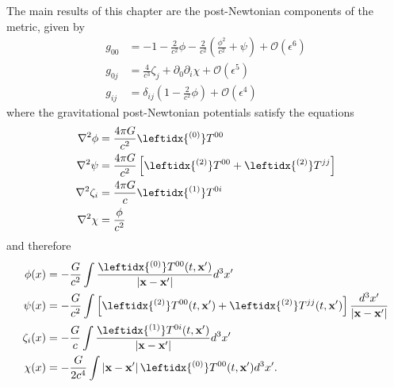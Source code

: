 The main results of this chapter are the post-Newtonian components of the metric, given by
\begin{subequations}\label{eq:PNMetricTensor}
\begin{align}
g_{00} &= -1 - \frac{2}{c^2} \phi - \frac{2}{c^2} \left(\frac{\phi^2}{c^2} + \psi \right) + \mathcal{O} \left( \epsilon^6 \right) \\
g_{0j} &= \frac{4}{c^3} \zeta_j + \partial_0 \partial_i \chi +  \mathcal{O} \left( \epsilon^5 \right) \\
g_{ij} &= \delta_{ij} \left( 1 - \frac{2}{c^2} \phi \right) + \mathcal{O} \left( \epsilon^4 \right)
\end{align}
\end{subequations}
where the gravitational post-Newtonian potentials satisfy the equations
\begin{subequations}\label{eq:PoissonEquations}
\begin{align}
\nabla^2 \phi &= \frac{4\pi G}{c^2} \leftidx{^{(0)}} T^{00} \\
\nabla^2 \psi &= \frac{4\pi G}{c^2} \left[ \leftidx{^{(2)}} T^{00} + \leftidx{^{(2)}} T^{jj} \right]  \\
\nabla^2 \zeta_i &= \frac{4\pi G}{c}  \leftidx{^{(1)}}T^{0i} \\
\nabla^2 \chi &= \frac{\phi}{c^2}
\end{align}
\end{subequations}
and therefore
\begin{subequations}\label{eq:postNewtonianPotentials}
\begin{align}
\phi (x) &= - \frac{G}{c^2} \int \frac{\leftidx{^{(0)}}T^{00} (t,  \textbf{x}')}{\left|  \textbf{x} - \textbf{x}' \right|} d^3 x' \\
\psi (x) &= -  \frac{G}{c^2} \int \left[ \leftidx{ ^{(2)}} T^{00} (t,  \textbf{x}') + \leftidx{ ^{(2)}} T^{jj}(t,  \textbf{x}') \right]  \frac{d^3 x'}{\left| \textbf{x} - \textbf{x}'\right|} \\
\zeta_i (x) &= - \frac{G}{c} \int \frac{\leftidx{^{(1)}}T^{0i}(t, \textbf{x}') }{\left|  \textbf{x} - \textbf{x}' \right|} d^3 x' \\
\chi (x) &= -\frac{G}{2c^4} \int \left|  \textbf{x} - \textbf{x}' \right| \leftidx{^{(0)}}T^{00} (t,  \textbf{x}') d^3 x'.
\end{align}
\end{subequations}

